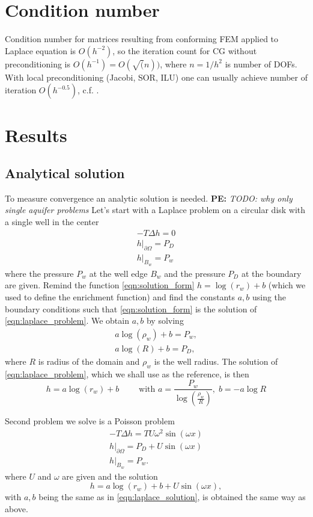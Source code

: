 \documentclass[preprint,12pt]{elsarticle}
\newcommand{\notePE}[1]{{\color{Orange} \textbf{PE: } \textit{#1}}}
\begin{document}
\section{Condition number}
Condition number for matrices resulting from conforming FEM applied to Laplace equation is $O(h^{-2})$, so the iteration count 
for CG without preconditioning is $O(h^{-1})=O(\sqrt(n))$, where $n=1/h^2$ is number of DOFs. With local preconditioning (Jacobi, 
SOR, ILU) one can usually achieve number of iteration $O(h^{-0.5})$, c.f. \cite{ern_evaluation_2006}.


\section{Results}
\label{sec:results}

\subsection{Analytical solution}
To measure convergence an analytic solution is needed. 
\notePE{TODO: why only single aquifer problems}
Let's start with a Laplace problem on a circular disk
with a single well in the center
\begin{eqnarray} \label{eqn:laplace_problem}
    -T \Delta h = 0 \nonumber\\
    h|_{\partial\Omega} = P_D \\
    h|_{B_w} = P_w \nonumber
\end{eqnarray}
where the pressure $P_w$ at the well edge $B_w$ and the pressure $P_D$ at the boundary are given.
Remind the function \eqref{eqn:solution_form} $h=\log(r_w)+b$ (which we used to define the enrichment function) 
and find the constants $a,b$ using the boundary conditions such that \eqref{eqn:solution_form} is the solution 
of \eqref{eqn:laplace_problem}.
We obtain $a,b$ by solving
\begin{eqnarray*}
  a\log(\rho_w) + b = P_w, \\
  a\log(R) + b = P_D,
\end{eqnarray*}
where $R$ is radius of the domain and $\rho_w$ is the well radius.
The solution of \eqref{eqn:laplace_problem}, which we shall use as the reference, is then
\begin{equation} \label{eqn:laplace_solution}
  h=a\log(r_w)+b \qquad \textrm{ with } a=\frac{P_w}{\log\left(\frac{\rho_w}{R}\right)}, \; b=-a\log R
\end{equation}

Second problem we solve is a Poisson problem
\begin{eqnarray} \label{eqn:poisson_problem}
    -T \Delta h = TU\omega^2\sin(\omega x) \nonumber\\
    h|_{\partial\Omega} = P_D + U\sin(\omega x)\\
    h|_{B_w} = P_w. \nonumber
\end{eqnarray}
where $U$ and $\omega$ are given
and the solution 
\begin{equation} \label{eqn:poisson_solution}
  h=a\log(r_w)+b+U\sin(\omega x),
\end{equation}
with $a,b$ being the same as in \eqref{eqn:laplace_solution}, is obtained the same way as above.
\end{document}
